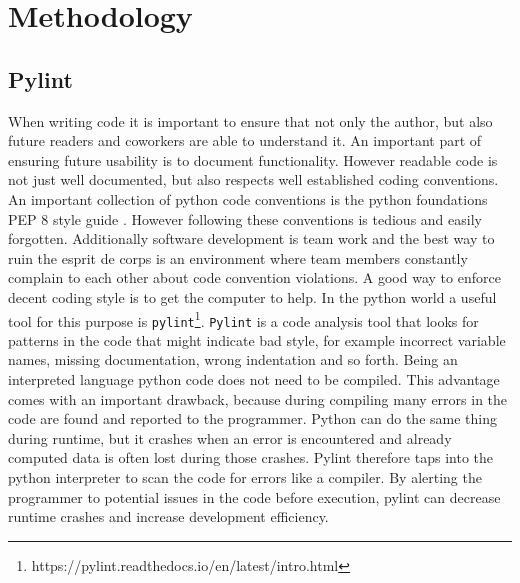 \chapter{Methodology}
\label{cha:problemStatement}


\section{Pylint}
When writing code it is important to ensure that not only the author, but also future readers and coworkers are able to understand it. An important part of ensuring future usability is to document functionality. However readable code is not just well documented, but also respects well established coding conventions. An important collection of python code conventions is the python foundations PEP 8 style guide \cite{VanRossum2001}. However following these conventions is tedious and easily forgotten. Additionally software development is team work and the best way to ruin the esprit de corps is an environment where team members constantly complain to each other about code convention violations.
A good way to enforce decent coding style is to get the computer to help. In the python world a useful tool for this purpose is \texttt{pylint}\footnote{https://pylint.readthedocs.io/en/latest/intro.html}. \texttt{Pylint} is a code analysis tool that looks for patterns in the code that might indicate bad style, for example incorrect variable names, missing documentation, wrong indentation and so forth. 
Being an interpreted language python code does not need to be compiled. This advantage comes with an important drawback, because during compiling many errors in the code are found and reported to the programmer. Python can do the same thing during runtime, but it crashes when an error is encountered and already computed data is often lost during those crashes. Pylint therefore taps into the python interpreter to scan the code for errors like a compiler. By alerting the programmer to potential issues in the code before execution, pylint can decrease runtime crashes and increase development efficiency.    